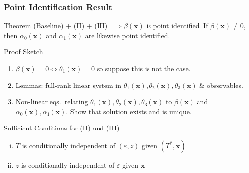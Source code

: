 \documentclass{beamer}
\begin{document}
\begin{frame}
  \frametitle{Point Identification Result}

  \small 

  \begin{alertblock}{Theorem}
    (Baseline) + (II) + (III) $\implies \beta(\mathbf{x})$ is point identified.
    If $\beta(\mathbf{x}) \neq 0$, then $\alpha_0(\mathbf{x})$ and $\alpha_1(\mathbf{x})$ are likewise point identified.
  \end{alertblock}

  \begin{alertblock}{Proof Sketch}
    \vspace{-0.5em}
    \begin{enumerate}
      \item $\beta(\mathbf{x})=0 \iff \theta_1(\mathbf{x}) =0$ so suppose this is not the case.  
      \item Lemmas: full-rank linear system in $\theta_1(\mathbf{x}), \theta_2(\mathbf{x}), \theta_3(\mathbf{x})$ \& observables.
      \item Non-linear eqs.\ relating $\theta_1(\mathbf{x}),\theta_2(\mathbf{x}), \theta_3(\mathbf{x})$ to  $\beta(\mathbf{x})$ and $\alpha_0(\mathbf{x}), \alpha_1(\mathbf{x})$. 
        Show that solution exists and is unique.
    \end{enumerate}
  \end{alertblock}

  \vspace{-0.5em}

  \begin{block}{Sufficient Conditions for (II) and (III)}
    \vspace{-0.5em}
    \begin{enumerate}[(i)]
      \item $T$ is conditionally independent of $(\varepsilon,z)$ given $(T^*,\mathbf{x})$
      \item $z$ is conditionally independent of $\varepsilon$ given $\mathbf{x}$
    \end{enumerate}
  \end{block}
  
\end{frame}
\end{document}
